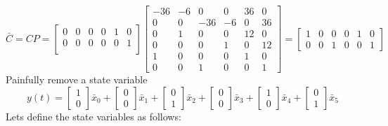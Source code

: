 \begin{enumerate}
\begin{enumerate}
\begin{equation}
      \end{equation}
      \begin{equation}
        \bar C = CP = 
        \begin{bmatrix}
          0 & 0 & 0 & 0 & 1 & 0 \\
          0 & 0 & 0 & 0 & 0 & 1 \\
        \end{bmatrix}
        \left[\begin{matrix}-36 & -6 & 0 & 0 & 36 & 0\\0 & 0 & -36 & -6 & 0 & 36\\0 & 1 & 0 & 0 & 12 & 0\\0 & 0 & 0 & 1 & 0 & 12\\1 & 0 & 0 & 0 & 1 & 0\\0 & 0 & 1 & 0 & 0 & 1\end{matrix}\right] =
        \left[\begin{matrix}1 & 0 & 0 & 0 & 1 & 0\\0 & 0 & 1 & 0 & 0 & 1\end{matrix}\right]
      \end{equation}
      Painfully remove a state variable
      \begin{equation}
        y(t) =
        \begin{bmatrix}
          1 \\
          0
        \end{bmatrix}\bar x_0 + 
        \begin{bmatrix}
          0 \\
          0
        \end{bmatrix}\bar x_1 + 
        \begin{bmatrix}
          0 \\
          1
        \end{bmatrix}\bar x_2 + 
        \begin{bmatrix}
          0 \\
          0
        \end{bmatrix}\bar x_3 + 
        \begin{bmatrix}
          1 \\
          0
        \end{bmatrix}\bar x_4 + 
        \begin{bmatrix}
          0 \\
          1
        \end{bmatrix}\bar x_5
      \end{equation}
      Lets define the state variables as follows:

\end{enumerate}
\end{enumerate}
